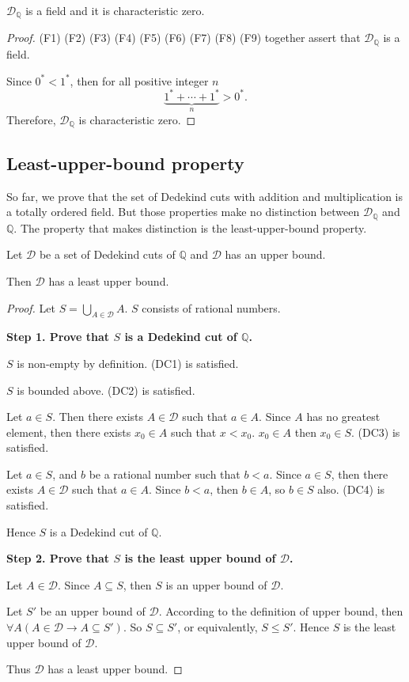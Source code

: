\begin{theorem}
    $\mathscr{D}_{\mathbb{Q}}$ is a field and it is characteristic zero.
\end{theorem}

\begin{proof}
    (F1) (F2) (F3) (F4) (F5) (F6) (F7) (F8) (F9) together assert that $\mathscr{D}_{\mathbb{Q}}$ is a field.

    Since ${0}^{*} < {1}^{*}$, then for all positive integer $n$
    \[
        \underbrace{{1}^{*} + \cdots + {1}^{*}}_{n} > {0}^{*}.
    \]
    Therefore, $\mathscr{D}_{\mathbb{Q}}$ is characteristic zero.
\end{proof}

\subsection{Least-upper-bound property}

So far, we prove that the set of Dedekind cuts with addition and multiplication is a totally ordered field. But those properties make no distinction between $\mathscr{D}_{\mathbb{Q}}$ and $\mathbb{Q}$. The property that makes distinction is the least-upper-bound property.

\begin{theorem}
    Let $\mathcal{D}$ be a set of Dedekind cuts of $\mathbb{Q}$ and $\mathcal{D}$ has an upper bound.

    Then $\mathcal{D}$ has a least upper bound.
\end{theorem}

\begin{proof}
    Let $S = \bigcup\limits_{A\in\mathcal{D}} A$. $S$ consists of rational numbers.

    \textbf{Step 1. Prove that $S$ is a Dedekind cut of $\mathbb{Q}$.}

    $S$ is non-empty by definition. (DC1) is satisfied.

    $S$ is bounded above. (DC2) is satisfied.

    Let $a\in S$. Then there exists $A\in\mathcal{D}$ such that $a\in A$. Since $A$ has no greatest element, then there exists $x_{0}\in A$ such that $x < x_{0}$. $x_{0}\in A$ then $x_{0}\in S$. (DC3) is satisfied.

    Let $a\in S$, and $b$ be a rational number such that $b < a$. Since $a\in S$, then there exists $A\in\mathcal{D}$ such that $a\in A$. Since $b < a$, then $b\in A$, so $b\in S$ also. (DC4) is satisfied.

    Hence $S$ is a Dedekind cut of $\mathbb{Q}$.
    \bigskip

    \textbf{Step 2. Prove that $S$ is the least upper bound of $\mathcal{D}$.}

    Let $A\in\mathcal{D}$. Since $A\subseteq S$, then $S$ is an upper bound of $\mathcal{D}$.

    Let $S'$ be an upper bound of $\mathcal{D}$. According to the definition of upper bound, then $\forall A (A\in\mathcal{D}\rightarrow A\subseteq S')$. So $S\subseteq S'$, or equivalently, $S\le S'$. Hence $S$ is the least upper bound of $\mathcal{D}$.

    Thus $\mathcal{D}$ has a least upper bound.
\end{proof}

